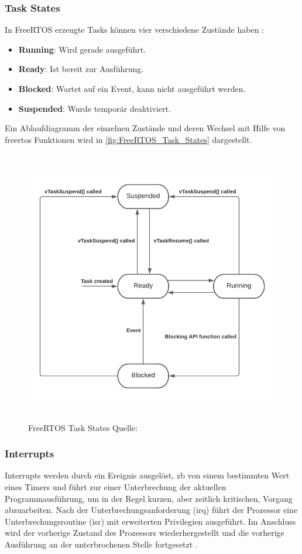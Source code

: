 \documentclass[../EDF Master Thesis.tex]{subfiles}
\begin{document}
\subsubsection{Task States}
In FreeRTOS erzeugte Tasks können vier verschiedene Zustände haben \parencite{freertos-task-states}:

\begin{itemize}
    \item \textbf{Running}: Wird gerade ausgeführt.
    \item \textbf{Ready}: Ist bereit zur Ausführung.
    \item \textbf{Blocked}: Wartet auf ein Event, kann nicht ausgeführt werden.
    \item \textbf{Suspended}: Wurde temporär deaktiviert.
\end{itemize}

Ein Ablaufdiagramm der einzelnen Zustände und deren Wechsel mit Hilfe von \ac{freertos} Funktionen wird in \autoref{fig:FreeRTOS_Task_States} dargestellt.

\begin{figure}[H]
    \centering
    \includegraphics[height=12cm, width=12cm]{./attachments/FreeRTOS_Task_States.pdf}
    \caption{FreeRTOS Task States Quelle: \parencite{freertos-task-states}}
    \label{fig:FreeRTOS_Task_States}
\end{figure}

\subsubsection{Interrupts}
Interrupts werden durch ein Ereignis ausgelöst, \ac{zb} von einem bestimmten Wert eines Timers und führt zur einer Unterbrechung der aktuellen Programmausführung, um in der Regel kurzen, aber zeitlich kritischen, Vorgang abzuarbeiten.
Nach der Unterbrechungsanforderung (\ac{irq}) führt der Prozessor eine Unterbrechungsroutine (\ac{isr}) mit erweiterten Privilegien ausgeführt.
Im Anschluss wird der vorherige Zustand des Prozessors wiederhergestellt und die vorherige Ausführung an der unterbrochenen Stelle fortgesetzt \parencite{wiki:008}.
\end{document}
